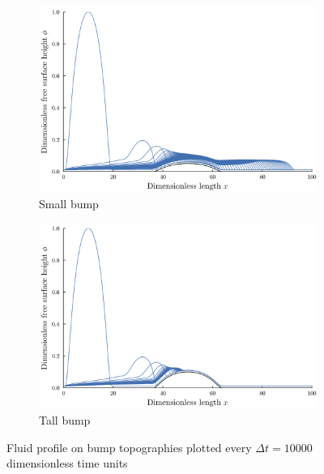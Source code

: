 \documentclass{article}
\begin{document}
\begin{figure}[h]
    \centering
    \begin{subfigure}[b]{0.5\textwidth}
        \includegraphics[width=\textwidth]{images/bump_05/plt_notitle.png}
        \caption{Small bump}
        \label{fig:bump05_profile}
    \end{subfigure}%
    \begin{subfigure}[b]{0.5\textwidth}
        \includegraphics[width=\textwidth]{images/bump_10_shorter/plt_notitle.png}
        \caption{Tall bump}
        \label{fig:bump10_profile}
    \end{subfigure}
    \caption{Fluid profile on bump topographies plotted every $\Delta t = 10000$ dimensionless time units}
    \label{fig:bump_profiles}
\end{figure}
 
\newpage
\begin{appendices}
    
\end{appendices}

\newpage
\printbibliography
\end{document}
